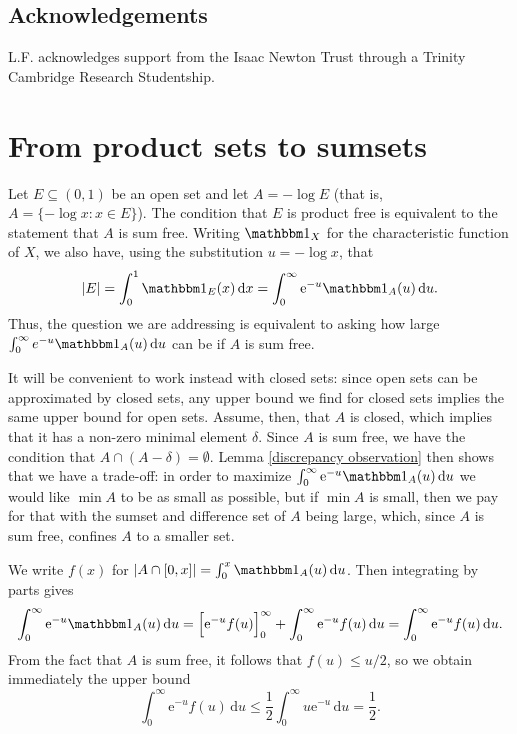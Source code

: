 \documentclass[11pt,reqno]{amsart}
\theoremstyle{definition}
\def\d{\delta}
\def\F#1{f(#1)}
\def\subset{\subseteq}
\begin{document}
\subsection*{Acknowledgements}
L.F. acknowledges support from the Isaac Newton Trust through a Trinity Cambridge Research Studentship. 

\section{From product sets to sumsets}

Let $E\subset(0,1)$ be an open set and let $A=-\log E$ (that is, $A=\{-\log x:x\in E\}$). The condition that $E$ is product free is equivalent to the statement that $A$ is sum free. Writing $\mathbbm 1_X$ for the characteristic function of $X$, we also have, using the substitution $u=-\log x$, that 
\[|E|=\int_0^1\mathbbm 1_E(x)\,\mathrm dx=\int_0^\infty\mathrm e^{-u}\mathbbm 1_A(u)\,\mathrm du.\]
Thus, the question we are addressing is equivalent to asking how large $\int_0^\infty e^{-u}\mathbbm 1_A(u)\,\mathrm du$ can be if $A$ is sum free. 

It will be convenient to work instead with closed sets: since open sets can be approximated by closed sets, any upper bound we find for closed sets implies the same upper bound for open sets. Assume, then, that $A$ is closed, which implies that it has a non-zero minimal element $\d$. Since $A$ is sum free, we have the condition that $A\cap(A-\d)=\emptyset$. Lemma \ref{discrepancy observation} then shows that we have a trade-off: in order to maximize $\int_0^\infty \mathrm e^{-u}\mathbbm 1_A(u)\,\mathrm du$ we would like $\min A$ to be as small as possible, but if $\min A$ is small, then we pay for that with the sumset and difference set of $A$ being large, which, since $A$ is sum free, confines $A$ to a smaller set. 

We write $\F{x}$ for $|A\cap[0,x]|=\int_0^x\mathbbm 1_A(u)\,\mathrm du$. Then integrating by parts gives
\[\int_0^\infty\mathrm e^{-u}\mathbbm 1_A(u)\,\mathrm du=\Big[\mathrm e^{-u}\F{u}\Big]_0^\infty+\int_0^\infty\mathrm e^{-u}\F{u}\,\mathrm du=\int_0^\infty\mathrm e^{-u}\F{u}\,\mathrm du.\]
From the fact that $A$ is sum free, it follows that $\F{u}\leq u/2$, so we obtain immediately the upper bound
\[\int_0^\infty\mathrm e^{-u}\F{u}\,\mathrm du\leq\frac 12\int_0^\infty u\mathrm e^{-u}\,\mathrm du=\frac 12.\]
\end{document}
